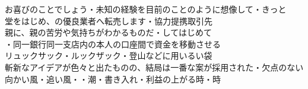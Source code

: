 お喜びのことでしょう・未知の経験を目前のことのように想像して・きっと\\
堂をはじめ、の優良業者へ転売します・協力提携取引先\\
親に、親の苦労や気持ちがわかるものだ・してはじめて\\
・同一銀行同一支店内の本人の口座間で資金を移動させる\\

リュックサック・ルックザック・登山などに用いるい袋\\
斬新なアイデアが色々と出たものの、結局は一番な案が採用された・欠点のない\\
向かい風\opp・追い風・・潮・書き入れ・利益の上がる時・\opp{}時\\
